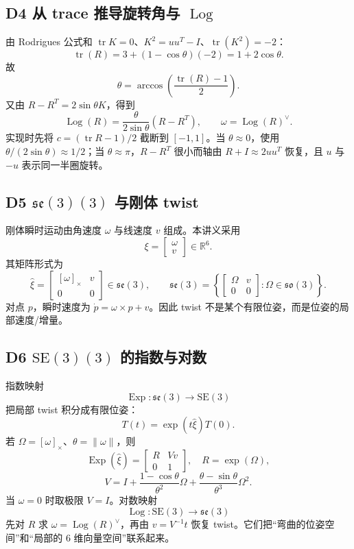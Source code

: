 \documentclass[UTF8,a4paper,11pt]{ctexart}
\newcommand{\R}{\mathbb{R}}
\newcommand{\SE}{\mathrm{SE}(3)}
\newcommand{\so}{\mathfrak{so}(3)}
\newcommand{\se}{\mathfrak{se}(3)}
\newcommand{\Exp}{\operatorname{Exp}}
\newcommand{\Log}{\operatorname{Log}}
\newcommand{\hatmat}[1]{\left[#1\right]_{\times}}
\begin{document}
\subsection{D4 从 trace 推导旋转角与 \texorpdfstring{$\Log$}{Log}}
由 Rodrigues 公式和 $\operatorname{tr}K=0$、$K^2=uu^T-I$、$\operatorname{tr}(K^2)=-2$：
\[
\operatorname{tr}(R)=3+(1-\cos\theta)(-2)=1+2\cos\theta.
\]
故
\[
\boxed{\theta=\arccos\!\left(\frac{\operatorname{tr}(R)-1}{2}\right)}.
\]
又由 $R-R^T=2\sin\theta K$，得到
\[
\Log(R)=\frac{\theta}{2\sin\theta}(R-R^T),
\qquad \omega=\Log(R)^\vee.
\]
实现时先将 $c=(\operatorname{tr}R-1)/2$ 截断到 $[-1,1]$。当 $\theta\approx0$，使用 $\theta/(2\sin\theta)\approx1/2$；当 $\theta\approx\pi$，$R-R^T$ 很小而轴由 $R+I\approx2uu^T$ 恢复，且 $u$ 与 $-u$ 表示同一半圈旋转。

\subsection{D5 \texorpdfstring{$\se(3)$}{se(3)} 与刚体 twist}
刚体瞬时运动由角速度 $\omega$ 与线速度 $v$ 组成。本讲义采用
\[
\xi=\begin{bmatrix}\omega\\v\end{bmatrix}\in\R^6.
\]
其矩阵形式为
\[
\hat\xi=\begin{bmatrix}\hatmat{\omega}&v\\0&0\end{bmatrix}\in\se,
\qquad
\se=\left\{\begin{bmatrix}\Omega&v\\0&0\end{bmatrix}:\Omega\in\so\right\}.
\]
对点 $p$，瞬时速度为 $\dot p=\omega\times p+v$。因此 twist 不是某个有限位姿，而是位姿的局部速度/增量。

\subsection{D6 \texorpdfstring{$\SE(3)$}{SE(3)} 的指数与对数}
指数映射
\[
\Exp:\se\to\SE
\]
把局部 twist 积分成有限位姿：
\[
T(t)=\exp(t\hat\xi)T(0).
\]
若 $\Omega=\hatmat{\omega}$、$\theta=\|\omega\|$，则
\[
\Exp(\hat\xi)=\begin{bmatrix}R&Vv\\0&1\end{bmatrix},\quad R=\exp(\Omega),
\]
\[
V=I+\frac{1-\cos\theta}{\theta^2}\Omega+\frac{\theta-\sin\theta}{\theta^3}\Omega^2.
\]
当 $\omega=0$ 时取极限 $V=I$。对数映射
\[
\Log:\SE\to\se
\]
先对 $R$ 求 $\omega=\Log(R)^\vee$，再由 $v=V^{-1}t$ 恢复 twist。它们把“弯曲的位姿空间”和“局部的 6 维向量空间”联系起来。
\end{document}

